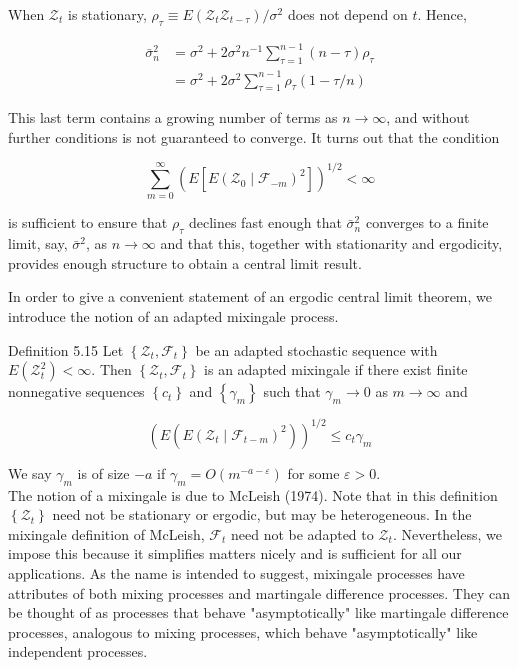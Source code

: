 \documentclass[10pt]{article}
\begin{document}
When $\mathcal{Z}_{t}$ is stationary, $\rho_{\tau} \equiv E\left(\mathcal{Z}_{t} \mathcal{Z}_{t-\tau}\right) / \sigma^{2}$ does not depend on $t$. Hence,

$$
\begin{aligned}
\bar{\sigma}_{n}^{2} & =\sigma^{2}+2 \sigma^{2} n^{-1} \sum_{\tau=1}^{n-1}(n-\tau) \rho_{\tau} \\
& =\sigma^{2}+2 \sigma^{2} \sum_{\tau=1}^{n-1} \rho_{\tau}(1-\tau / n)
\end{aligned}
$$

This last term contains a growing number of terms as $n \rightarrow \infty$, and without further conditions is not guaranteed to converge. It turns out that the condition

$$
\sum_{m=0}^{\infty}\left(E\left[E\left(\mathcal{Z}_{0} \mid \mathcal{F}_{-m}\right)^{2}\right]\right)^{1 / 2}<\infty
$$

is sufficient to ensure that $\rho_{\tau}$ declines fast enough that $\bar{\sigma}_{n}^{2}$ converges to a finite limit, say, $\bar{\sigma}^{2}$, as $n \rightarrow \infty$ and that this, together with stationarity and ergodicity, provides enough structure to obtain a central limit result.

In order to give a convenient statement of an ergodic central limit theorem, we introduce the notion of an adapted mixingale process.

Definition 5.15 Let $\left\{\mathcal{Z}_{t}, \mathcal{F}_{t}\right\}$ be an adapted stochastic sequence with $E\left(\mathcal{Z}_{t}^{2}\right) <\infty$. Then $\left\{\mathcal{Z}_{t}, \mathcal{F}_{t}\right\}$ is an adapted mixingale if there exist finite nonnegative sequences $\left\{c_{t}\right\}$ and $\left\{\gamma_{m}\right\}$ such that $\gamma_{m} \rightarrow 0$ as $m \rightarrow \infty$ and

$$
\left(E\left(E\left(\mathcal{Z}_{t} \mid \mathcal{F}_{t-m}\right)^{2}\right)\right)^{1 / 2} \leq c_{t} \gamma_{m}
$$

We say $\gamma_{m}$ is of size $-a$ if $\gamma_{m}=O\left(m^{-a-\varepsilon}\right)$ for some $\varepsilon>0$.\\
The notion of a mixingale is due to McLeish (1974). Note that in this definition $\left\{\mathcal{Z}_{t}\right\}$ need not be stationary or ergodic, but may be heterogeneous. In the mixingale definition of McLeish, $\mathcal{F}_{t}$ need not be adapted to $\mathcal{Z}_{t}$. Nevertheless, we impose this because it simplifies matters nicely and is sufficient for all our applications. As the name is intended to suggest, mixingale processes have attributes of both mixing processes and martingale difference processes. They can be thought of as processes that behave "asymptotically" like martingale difference processes, analogous to mixing processes, which behave "asymptotically" like independent processes.
\end{document}
